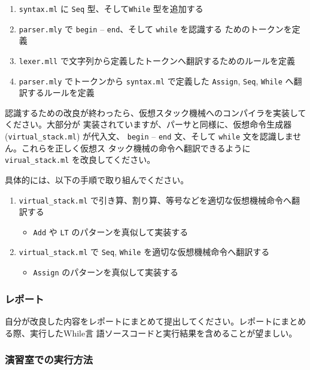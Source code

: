 \documentclass[a4paper,11pt]{jsarticle}
\begin{document}
\noindent{}

\begin{enumerate}
\item \verb|syntax.ml| に \verb|Seq| 型、そして\verb|While| 型を追加する
\item \verb|parser.mly| で \verb|begin| -- \verb|end|、そして \verb|while| を認識する
  ためのトークンを定義
\item \verb|lexer.mll| で文字列から定義したトークンへ翻訳するためのルールを定義
\item \verb|parser.mly| でトークンから \verb|syntax.ml| で定義した \verb|Assign|,
  \verb|Seq|, \verb|While| へ翻訳するルールを定義
\end{enumerate}

\noindent{}

認識するための改良が終わったら、仮想スタック機械へのコンパイラを実装してください。大部分が
実装されていますが、パーサと同様に、仮想命令生成器 (\verb|virtual_stack.ml|) が代入文、
\verb|begin| -- \verb|end| 文、そして \verb|while| 文を認識しません。これらを正しく仮想ス
タック機械の命令へ翻訳できるように \verb|virual_stack.ml| を改良してください。

具体的には、以下の手順で取り組んでください。

\begin{enumerate}
\item \verb|virtual_stack.ml| で引き算、割り算、等号などを適切な仮想機械命令へ翻訳する
  \begin{itemize}
  \item \verb|Add| や \verb|LT| のパターンを真似して実装する
  \end{itemize}
\item \verb|virtual_stack.ml| で \verb|Seq|, \verb|While| を適切な仮想機械命令へ翻訳する
  \begin{itemize}
  \item \verb|Assign| のパターンを真似して実装する
  \end{itemize}
\end{enumerate}

\subsubsection{レポート}

自分が改良した内容をレポートにまとめて提出してください。レポートにまとめる際、実行したWhile言
語ソースコードと実行結果を含めることが望ましい。

\subsubsection{演習室での実行方法}
\end{document}
